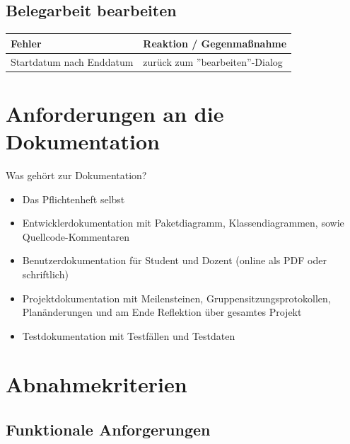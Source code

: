 \documentclass{article}
\begin{document}
\subsection{Belegarbeit bearbeiten}
\begin{tabular}{|p{7cm}|p{7cm}|}
\hline
	\textbf{Fehler}				&	\textbf{Reaktion / Gegenmaßnahme}	\\
\hline
\hline
	Startdatum nach Enddatum	&	zurück zum ''bearbeiten''-Dialog	\\
\hline
\end{tabular}

\section{Anforderungen an die Dokumentation}
Was gehört zur Dokumentation?
\begin{itemize}
\item Das Pflichtenheft selbst
\item Entwicklerdokumentation mit Paketdiagramm, Klassendiagrammen, sowie Quellcode-Kommentaren
\item Benutzerdokumentation für Student und Dozent (online als PDF oder schriftlich)
\item Projektdokumentation mit Meilensteinen, Gruppensitzungsprotokollen, Planänderungen und am Ende Reflektion über gesamtes Projekt
\item Testdokumentation mit Testfällen und Testdaten
\end{itemize}

\newpage
\section{Abnahmekriterien}
\subsection{Funktionale Anforgerungen}
\end{document}
